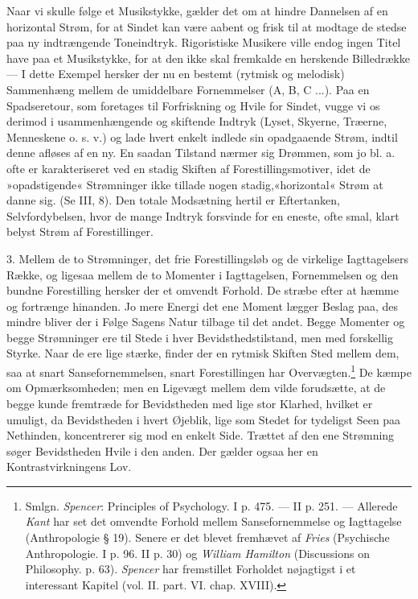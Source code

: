\documentclass[12pt,a4paper,openany]{book}
\newcommand{\opage}[1]{\marginnote{\footnotesize\textit{[#1]}}}
\begin{document}
Naar vi skulle følge et Musikstykke, gælder det om at hindre
Dannelsen af en horizontal Strøm, for at Sindet kan være aabent og frisk
til at modtage de stedse paa ny indtrængende Toneindtryk. Rigoristiske
Musikere ville endog ingen Titel have paa et Musikstykke, for at den
ikke skal fremkalde en herskende Billedrække --- I dette Exempel hersker
der nu en bestemt (rytmisk og melodisk) Sammenhæng mellem de umiddelbare
Fornemmelser (A, B, C ...). Paa en Spadseretour, som foretages til
Forfriskning og Hvile for Sindet, vugge vi os derimod i usammenhængende
og skiftende Indtryk (Lyset, Skyerne, Træerne, Menneskene o. s. v.) og
lade hvert enkelt indlede sin opadgaaende Strøm, indtil denne afløses af
en ny. En saadan Tilstand nærmer sig Drømmen, som jo bl. a. ofte er
karakteriseret ved en stadig Skiften af Forestillingsmotiver, idet de
»opadstigende« Strømninger ikke tillade nogen stadig,«horizontal« Strøm
at danne sig. (Se III, 8). Den totale Modsætning hertil er Eftertanken,
Selvfordybelsen, hvor de mange Indtryk forsvinde for en eneste, ofte
smal, klart belyst Strøm af Forestillinger.

3. Mellem de to Strømninger, det frie Forestillingsløb og de virkelige
Iagttagelsers Række, og ligesaa mellem de to Momenter i Iagttagelsen,
Fornemmelsen og den bundne Forestilling hersker der et omvendt Forhold.
De stræbe efter at hæmme og fortrænge hinanden. Jo mere Energi det ene
Moment lægger Beslag paa, des mindre bliver der i Følge Sagens Natur
tilbage til det andet. Begge Momenter og begge Strømninger ere til Stede
i hver Bevidsthedstilstand, men med forskellig Styrke. Naar de ere lige
stærke, finder der en rytmisk Skiften Sted mellem dem, saa at snart
Sansefornemmelsen,
\opage{158}snart Forestillingen har Overvægten.\footnote[1]{Smlgn.
\emph{Spencer}: Principles of Psychology. I p. 475. --- II p. 251. ---
Allerede \emph{Kant} har set det omvendte Forhold mellem
Sansefornemmelse og Iagttagelse (Anthropologie § 19). Senere er det
blevet fremhævet af \emph{Fries} (Psychische Anthropologie. I p. 96. II
p. 30) og \emph{William Hamilton} (Discussions on Philosophy. p. 63).
\emph{Spencer} har fremstillet Forholdet nøjagtigst i et interessant
Kapitel (vol. II. part. VI. chap. XVIII).} De kæmpe om Opmærksomheden;
men en Ligevægt mellem dem vilde forudsætte, at de begge kunde fremtræde
for Bevidstheden med lige stor Klarhed, hvilket er umuligt, da
Bevidstheden i hvert Øjeblik, lige som Stedet for tydeligst Seen paa
Nethinden, koncentrerer sig mod en enkelt Side. Trættet af den ene
Strømning søger Bevidstheden Hvile i den anden. Der gælder ogsaa her en
Kontrastvirkningens Lov.
\end{document}
